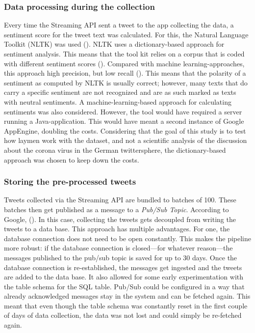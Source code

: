 \subsubsection{Data processing during the collection}
Every time the Streaming API sent a tweet to the app collecting the data, a sentiment score for the tweet text was calculated. For this, the Natural Language Toolkit (NLTK) was used (\cite{loper2002nltk}). NLTK uses a dictionary-based approach for sentiment analysis. This means that the tool kit relies on a corpus that is coded with different sentiment scores (\cite{haselmayer2017sentiment}). Compared with machine learning-approaches, this approach high precision, but low recall (\cite{soroka2015}). This means that the polarity of a sentiment as computed by NLTK is usually correct; however, many texts that do carry a specific sentiment are not recognized and are as such marked as texts with neutral sentiments.
A machine-learning-based approach for calculating sentiments was also considered. However, the tool would have required a server running a Java-application. This would have meant a second instance of Google AppEngine, doubling the costs. Considering that the goal of this study is to test how laymen work with the dataset, and not a scientific analysis of the discussion about the corona virus in the German twittersphere, the dictionary-based approach was chosen to keep down the costs.

\subsubsection{Storing the pre-processed tweets}
Tweets collected via the Streaming API are bundled to batches of 100. These batches then get published as a message to a \emph{Pub/Sub Topic}. According to Google,  (\cite{google2020a}). In this case, collecting the tweets gets decoupled from writing the tweets to a data base. This approach has multiple advantages. For one, the database connection does not need to be open constantly. This makes the pipeline more robust: if the database connection is closed---for whatever reason---the messages published to the pub/sub topic is saved for up to 30 days. Once the database connection is re-established, the messages get ingested and the tweets are added to the data base. It also allowed for some early experimentation with the table schema for the SQL table. Pub/Sub could be configured in a way that already acknowledged messages stay in the system and can be fetched again. This meant that even though the table schema was constantly reset in the first couple of days of data collection, the data was not lost and could simply be re-fetched again.


